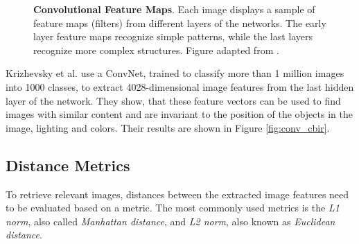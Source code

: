 \documentclass[12pt]{report}
\begin{document}
\begin{figure}[h]
\centering
{}\hspace{.3cm}
\hspace{.3cm}
\caption{\label{fig:conv_feats} \textbf{Convolutional Feature Maps}. Each image displays a sample of feature maps (filters) from different layers of the networks. The early layer feature maps recognize simple patterns, while the last layers recognize more complex structures. Figure adapted from \cite{gandhi_build_2018}.}
\end{figure}


Krizhevsky et al. \cite{NIPS2012_4824} use a ConvNet, trained to classify more than 1 million images into 1000 classes, to extract 4028-dimensional image features from the last hidden layer of the network. They show, that these feature vectors can be used to find images with similar content and are invariant to the position of the objects in the image, lighting and colors. Their results are shown in Figure \ref{fig:conv_cbir}.


\pagebreak
\subsection{Distance Metrics}
To retrieve relevant images, distances between the extracted image features need to be evaluated based on a metric. The most commonly used metrics is the \textit{L1 norm}, also called \textit{Manhattan distance}, and \textit{L2 norm}, also known as \textit{Euclidean distance}.
\end{document}
